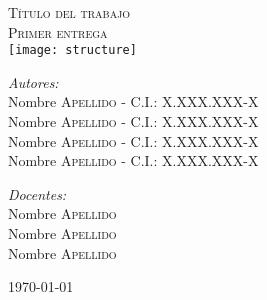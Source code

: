 \documentclass[a4paper,12pt]{article} %
\begin{document}
%
\renewcommand{\contentsname}{Tabla de contenidos}      %
\renewcommand{\tablename}{\bfseries Tabla}             %
\renewcommand{\figurename}{\bfseries Figura}           %
\newcommand{\subfigureautorefname}{\figureautorefname} %

\begin{titlepage}
	
	\begin{center}
	\begin{figure*}[h]
	\noindent 
	\captionsetup[subfigure]{labelformat=empty,justification=raggedright,singlelinecheck=false}
	\captionsetup[subfigure]{labelformat=empty,justification=raggedleft,singlelinecheck=false}
	\hfill
	\end{figure*} 
	
	\textsc{\huge Título del trabajo}\\[1.5cm] %
	
	\textsc{\LARGE Primer entrega}\\[0.5cm] %
	
	\texttt{[image: structure]} \\[1cm] %
	
	\vspace{-0.5cm}
	
	\noindent
	\begin{flushleft} \large
		\emph{Autores:}\\
		Nombre \textsc{Apellido} - C.I.: X.XXX.XXX-X \\
		Nombre \textsc{Apellido} - C.I.: X.XXX.XXX-X \\
		Nombre \textsc{Apellido} - C.I.: X.XXX.XXX-X \\
		Nombre \textsc{Apellido} - C.I.: X.XXX.XXX-X \\
		
		\vspace{0.5cm}
		
		\emph{Docentes:} \\
		Nombre \textsc{Apellido}\\
		Nombre \textsc{Apellido}\\
		Nombre \textsc{Apellido}
	\end{flushleft}
	\vfill
	
	{\large \today}
	
	\end{center}
\end{titlepage}
\end{document}
